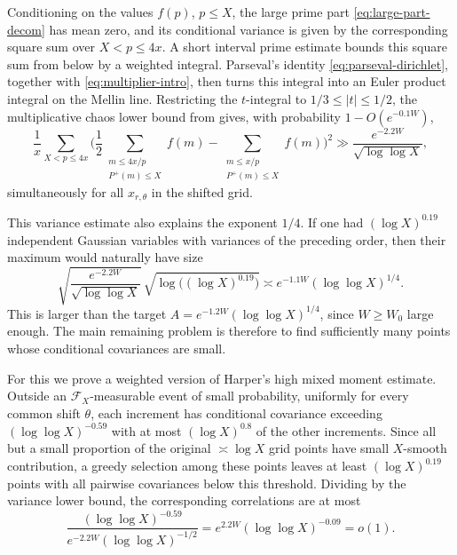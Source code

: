 \documentclass[a4paper,12pt,reqno]{amsart}
\numberwithin{equation}{section}
\theoremstyle{remark}
\begin{document}
Conditioning on the values \(f(p)\), \(p\leq X\), the large prime
part \eqref{eq:large-part-decom} has mean zero, and its conditional variance is given by the corresponding square sum over \(X<p\leq4x\).  
A short interval prime estimate bounds this square sum from below by a
weighted integral. Parseval's identity
\eqref{eq:parseval-dirichlet}, together with
\eqref{eq:multiplier-intro}, then turns this integral into an Euler product
integral on the Mellin line.
Restricting the \(t\)-integral to \(1/3\leq |t|\leq1/2\), the
multiplicative chaos lower bound from \cite{Harper2023Large} gives, with
probability \(1-O(e^{-0.1W})\),
\[
 \frac{1}{x}\sum_{X<p\leq4x}
 \Bigg(
 \frac12
 \sum_{\substack{m\leq4x/p\\P^+(m)\leq X}}f(m)
 -
 \sum_{\substack{m\leq x/p\\P^+(m)\leq X}}f(m)
 \Bigg)^2
 \gg
 \frac{e^{-2.2W}}{\sqrt{\log\log X}},
\]
simultaneously for all \(x_{r,\theta}\) in the shifted grid.


This variance estimate also explains the exponent \(1/4\). If one had
\((\log X)^{0.19}\) independent Gaussian variables with variances of the
preceding order, then their maximum would naturally have size
\[
 \sqrt{\frac{e^{-2.2W}}{\sqrt{\log\log X}}}\,
 \sqrt{\log\big((\log X)^{0.19}\big)}
 \asymp e^{-1.1W}(\log\log X)^{1/4}.
\]
This is larger than the target
\({A}=e^{-1.2W}(\log\log X)^{1/4}\), since \(W\ge W_0\) large enough. The main remaining
problem is therefore to find sufficiently many points whose conditional
covariances are small.

For this we prove a weighted version of Harper's high mixed moment
estimate. Outside an \(\mathscr F_X\)-measurable event of small
probability, uniformly for every common shift \(\theta\), each increment
has conditional covariance exceeding
\((\log\log X)^{-0.59}\) with at most \((\log X)^{0.8}\) of the other
increments.
Since all but a small proportion of the original \(\asymp\log X\) grid
points have small \(X\)-smooth contribution, a greedy selection among
these points leaves at least \((\log X)^{0.19}\) points with all pairwise
covariances below this threshold.
Dividing by the variance lower bound, the corresponding
correlations are at most
\[
 \frac{(\log\log X)^{-0.59}}
 {e^{-2.2W}(\log\log X)^{-1/2}}
 =
 e^{2.2W}(\log\log X)^{-0.09}=o(1).
\]
\end{document}
